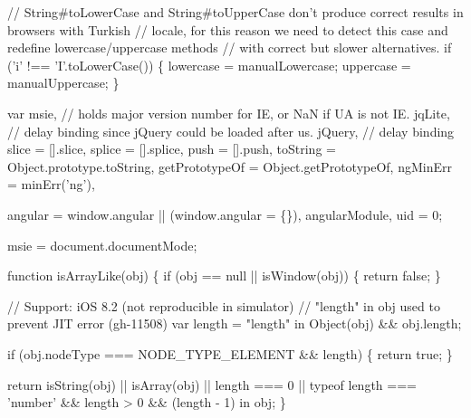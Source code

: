 \begin{DoxyCodeInclude}
\textcolor{comment}{// String#toLowerCase and String#toUpperCase don't produce correct results in browsers with Turkish}
\textcolor{comment}{// locale, for this reason we need to detect this case and redefine lowercase/uppercase methods}
\textcolor{comment}{// with correct but slower alternatives.}
\textcolor{keywordflow}{if} (\textcolor{charliteral}{'i'} !== \textcolor{charliteral}{'I'}.toLowerCase()) \{
  lowercase = manualLowercase;
  uppercase = manualUppercase;
\}


var
    msie,             \textcolor{comment}{// holds major version number for IE, or NaN if UA is not IE.}
    jqLite,           \textcolor{comment}{// delay binding since jQuery could be loaded after us.}
    jQuery,           \textcolor{comment}{// delay binding}
    slice             = [].slice,
    splice            = [].splice,
    push              = [].push,
    toString          = Object.prototype.toString,
    getPrototypeOf    = Object.getPrototypeOf,
    ngMinErr          = minErr(\textcolor{stringliteral}{'ng'}),

    angular           = window.angular || (window.angular = \{\}),
    angularModule,
    uid               = 0;

msie = document.documentMode;


\textcolor{keyword}{function} isArrayLike(obj) \{
  \textcolor{keywordflow}{if} (obj == null || isWindow(obj)) \{
    \textcolor{keywordflow}{return} \textcolor{keyword}{false};
  \}

  \textcolor{comment}{// Support: iOS 8.2 (not reproducible in simulator)}
  \textcolor{comment}{// "length" in obj used to prevent JIT error (gh-11508)}
  var length = \textcolor{stringliteral}{"length"} in Object(obj) && obj.length;

  \textcolor{keywordflow}{if} (obj.nodeType === NODE\_TYPE\_ELEMENT && length) \{
    \textcolor{keywordflow}{return} \textcolor{keyword}{true};
  \}

  \textcolor{keywordflow}{return} isString(obj) || isArray(obj) || length === 0 ||
         typeof length === \textcolor{stringliteral}{'number'} && length > 0 && (length - 1) in obj;
\}


\end{DoxyCodeInclude}
